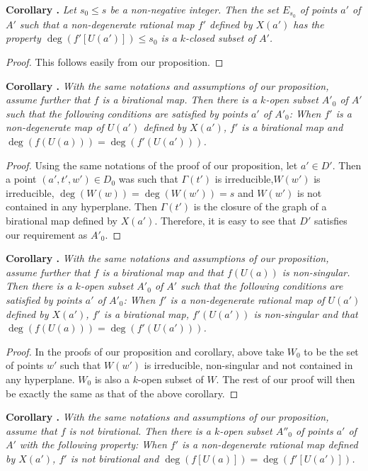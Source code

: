 \medskip
\noindent
{\bf Corollary .\label{art14-app-coro1}}
{\em Let $s_{0}\leq s$ be a non-negative integer. Then the set $E_{s_{0}}$ of points $a'$ of $A'$ such that a non-degenerate rational map $f'$ defined by $X(a')$ has the property $\deg(f'[U(a')])\leq s_{0}$ is a $k$-closed subset of $A'$.}

\begin{proof}
This follows easily from our proposition.
\end{proof}

\medskip
\noindent
{\bf Corollary .\label{art14-app-coro2}}
{\em With the same notations and assumptions of our proposition, assume further that $f$ is a birational map. Then there is a $k$-open subset $A'_{0}$ of $A'$ such that the following conditions are satisfied by points $a'$ of $A'_{0}$: When $f'$ is a non-degenerate map of $U(a')$ defined by $X(a')$, $f'$ is a birational map and $\deg(f(U(a)))=\deg (f'(U(a')))$.}

\begin{proof}
Using the same notations of the proof of our proposition, let $a'\in D'$. Then a point $(a',t',w')\in D_{0}$ was such that $\Gamma(t')$ is irreducible,\pageoriginale $W(w')$ is irreducible, $\deg(W(w))=\deg(W(w'))=s$ and $W(w')$ is not contained in any hyperplane. Then $\Gamma(t')$ is the closure of the graph of a birational map defined by $X(a')$. Therefore, it is easy to see that $D'$ satisfies our requirement as $A'_{0}$.
\end{proof}

\medskip
\noindent
{\bf Corollary .\label{art14-app-coro3}}
{\em With the same notations and assumptions of our proposition, assume further that $f$ is a birational map and that $f(U(a))$ is non-singular. Then there is a $k$-open subset $A'_{0}$ of $A'$ such that the following conditions are satisfied by points $a'$ of $A'_{0}$: When $f'$ is a non-degenerate rational map of $U(a')$ defined by $X(a')$, $f'$ is a birational map, $f'(U(a'))$ is non-singular and that $\deg(f(U(a)))=\deg (f'(U(a')))$.}

\begin{proof}
In the proofs of our proposition and corollary, above take $W_{0}$ to be the set of points $w'$ such that $W(w')$ is irreducible, non-singular and not contained in any hyperplane. $W_{0}$ is also a $k$-open subset of $W$. The rest of our proof will then be exactly the same as that of the above corollary.
\end{proof}

\medskip
\noindent
{\bf Corollary .\label{art14-app-coro4}}
{\em With the same notations and assumptions of our proposition, assume that $f$ is not birational. Then there is a $k$-open subset $A''_{0}$ of points $a'$ of $A'$ with the following property: When $f'$ is a non-degenerate rational map defined by $X(a')$, $f'$ is not birational and $\deg (f[U(a)])=\deg(f'[U(a')])$.}

